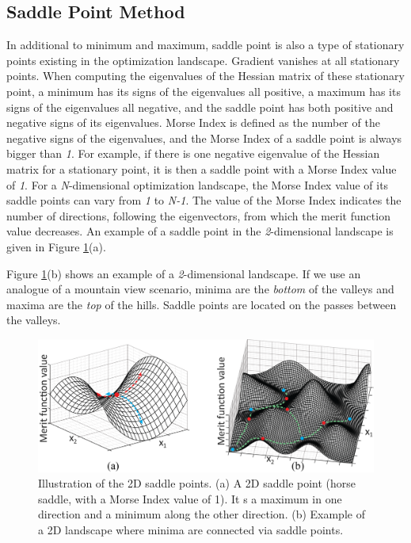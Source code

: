 \subsection{Saddle Point Method}
In additional to minimum and maximum, saddle point is also a type of stationary points existing in the optimization landscape. Gradient vanishes at all stationary points. When computing the eigenvalues of the Hessian matrix of these stationary point, a minimum has its signs of the eigenvalues all positive, a maximum has its signs of the eigenvalues all negative, and the saddle point has both positive and negative signs of its eigenvalues. Morse Index is defined as the number of the negative signs of the eigenvalues, and the Morse Index of a saddle point is always bigger than \textit{1}. For example, if there is one negative eigenvalue of the Hessian matrix for a stationary point, it is then a saddle point with a Morse Index value of \textit{1}. For a \textit{N}-dimensional optimization landscape, the Morse Index value of its saddle points can vary from \textit{1} to \textit{N-1}.  The value of the Morse Index indicates the number of directions, following the eigenvectors, from which the merit function value decreases. An example of a saddle point in the \textit{2}-dimensional landscape is given in Figure \ref{fig: saddle_illustration}(a). 

Figure \ref{fig: saddle_illustration}(b) shows an example of a \textit{2}-dimensional landscape. If we use an analogue of a mountain view scenario, minima are the \textit{bottom} of the valleys and maxima are the \textit{top} of the hills. Saddle points are located on the passes between the valleys. 

\begin{figure}
    \centering
    \includegraphics[scale=0.58]{chapter-1/figures/saddle_point_plotted.png}
    \caption{Illustration of the 2D saddle points. (a) A 2D saddle point (horse saddle, with a Morse Index value of 1). It s a maximum in one direction and a minimum along the other direction. (b) Example of a 2D landscape where minima are connected via saddle points. }
    \label{fig: saddle_illustration}
\end{figure} 


